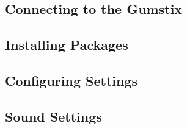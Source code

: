 \subsection{Connecting to the Gumstix}

\subsection{Installing Packages}

%

\subsection{Configuring Settings}

%

\subsection{Sound Settings}
